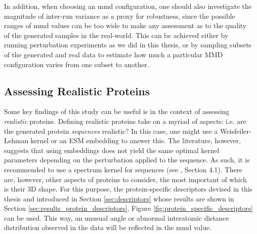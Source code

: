 In addition, when choosing an \acrshort{mmd} configuration, one should also
investigate the magnitude of inter-run variance as a proxy for robustness, since
the possible ranges of \acrshort{mmd} values can be too wide to make any
assessment as to the quality of the generated samples in the real-world. This
can be achieved either by running perturbation experiments as we did in this
thesis, or by sampling subsets of the generated and real data to estimate how
much a particular MMD configuration varies from one subset to another.

\subsection{Assessing Realistic Proteins}\label{sec:discussion_realistic_proteins}

Some key findings of this study can be useful is in the context of assessing
\emph{realistic} proteins. Defining realistic proteins take on a myriad of
aspects: i.e. are the generated protein \emph{sequences} realistic? In this
case, one might use a Weisfeiler-Lehman kernel or an ESM embedding to answer
this. The literature, however, suggests that using embeddings does not yield the
same optimal kernel parameters depending on the perturbation applied to the
sequence. As such, it is recommended to use a spectrum kernel
\citep{leslie2002spectrum} for sequences (see \cite{kucera2022conditional},
Section 4.1). There are, however, other aspects of proteins to consider, the
most important of which is their 3D shape. For this purpose, the
protein-specific descriptors devised in this thesis and introduced in Section
\ref{sec:descriptors} whose results are shown in Section
\ref{sec:results_protein_descriptors}, Figure
\ref{fig:protein_specific_descriptors} can be used. This way, an unusual angle
or abnormal interatomic distance distribution observed in the data will be
reflected in the \acrshort{mmd} value.


